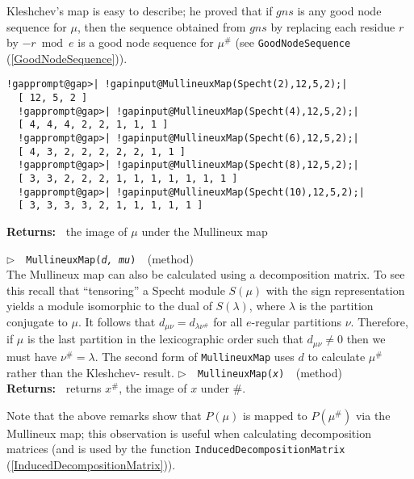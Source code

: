 \documentclass[a4paper,11pt]{report}
\begin{document}
{{{ Kleshchev's map is easy to describe; he proved that if $gns$ is any good node sequence for $\mu$, then the sequence obtained from $gns$ by replacing each residue $r$ by $-r\bmod e$ is a good node sequence for $\mu^\#$ (see \texttt{GoodNodeSequence} (\ref{GoodNodeSequence})). 
\begin{Verbatim}[commandchars=!@|,fontsize=\small,frame=single,label=Example]
  !gapprompt@gap>| !gapinput@MullineuxMap(Specht(2),12,5,2);|
  [ 12, 5, 2 ]
  !gapprompt@gap>| !gapinput@MullineuxMap(Specht(4),12,5,2);|
  [ 4, 4, 4, 2, 2, 1, 1, 1 ]
  !gapprompt@gap>| !gapinput@MullineuxMap(Specht(6),12,5,2);|
  [ 4, 3, 2, 2, 2, 2, 2, 1, 1 ]
  !gapprompt@gap>| !gapinput@MullineuxMap(Specht(8),12,5,2);|
  [ 3, 3, 2, 2, 2, 1, 1, 1, 1, 1, 1, 1 ]
  !gapprompt@gap>| !gapinput@MullineuxMap(Specht(10),12,5,2);|
  [ 3, 3, 3, 3, 2, 1, 1, 1, 1, 1 ]
\end{Verbatim}
 \textbf{\indent Returns:\ }
the image of $\mu$ under the Mullineux map

\noindent\textcolor{FuncColor}{$\triangleright$\ \ \texttt{MullineuxMap({\mdseries\slshape d, mu})
\label{MullineuxMap:for a decomposition matrix}
}\hfill{\scriptsize (method)}}\\


 The Mullineux map can also be calculated using a decomposition matrix. To see
this recall that ``tensoring'' a Specht module $S(\mu)$ with the sign representation yields a module isomorphic to the dual of $S(\lambda)$, where $\lambda$ is the partition conjugate to $\mu$. It follows that $d_{\mu\nu}=d_{\lambda\nu^\#}$ for all $e$-regular partitions $\nu$. Therefore, if $\mu$ is the last partition in the lexicographic order such that $d_{\mu\nu}\neq 0$ then we must have $\nu^\#=\lambda$. The second form of \texttt{MullineuxMap} uses $d$ to calculate $\mu^\#$ rather than the Kleshchev-\cite{LLT} result. \noindent\textcolor{FuncColor}{$\triangleright$\ \ \texttt{MullineuxMap({\mdseries\slshape x})
\label{MullineuxMap:for a module}
}\hfill{\scriptsize (method)}}\\
\textbf{\indent Returns:\ }
returns $x^\#$, the image of $x$ under $\#$.



 Note that the above remarks show that $P(\mu)$ is mapped to $P(\mu^\#)$ via the Mullineux map; this observation is useful when calculating
decomposition matrices (and is used by the function \texttt{InducedDecompositionMatrix} (\ref{InducedDecompositionMatrix})).

}}}
\end{document}
